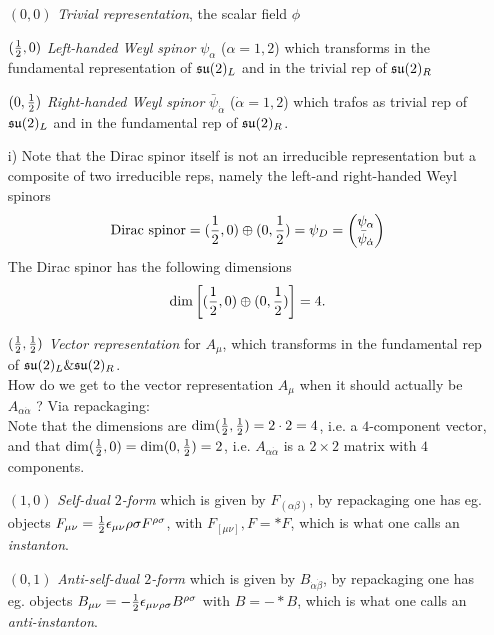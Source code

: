 \begin{enumerate}
\item[$(0,0)$] \emph{Trivial representation}, the scalar field $\phi$
\item[$(\frac{1}{2},0)$] \emph{Left-handed Weyl spinor} $\psi_\alpha$ ($\alpha=1,2$) which transforms in the fundamental representation of $\mathfrak{su}(2)_L$ and in the trivial rep of $\mathfrak{su}(2)_R$
\item[$(0,\frac{1}{2})$] \emph{Right-handed Weyl spinor} $\bar{ \psi}_{\dot{\alpha}}$ ($\dot{\alpha}=1,2$) which trafos as trivial rep of $\mathfrak{su}(2)_L$ and in the fundamental rep of $\mathfrak{su}(2)_R$.
\item[i)] Note that the Dirac spinor itself is not an irreducible representation but a composite of two irreducible reps, namely the left-and right-handed Weyl spinors
\begin{equation*}
	\text{Dirac spinor} = (\frac{1}{2},0) \oplus (0,\frac{1}{2}) = \psi_D = \begin{pmatrix}
		\psi_\alpha\\
		\bar{ \psi}_{\dot{\alpha}}\\
			\end{pmatrix}
\end{equation*}
The Dirac spinor has the following dimensions
\begin{equation*}
 \dim\left[(\frac{1}{2},0)\oplus (0,\frac{1}{2}) \right] = 4.
\end{equation*}

\item[$(\frac{1}{2},\frac{1}{2})$] \emph{Vector representation} for $A_\mu$, which transforms in the fundamental rep of $\mathfrak{su}(2)_L\&\mathfrak{su}(2)_R$.\\
How do we get to the vector representation $A_\mu$ when it should actually be $A_{\alpha \dot{\alpha}}$ ? Via repackaging:\\
Note that the dimensions are $\dim(\frac{1}{2},\frac{1}{2})=2\cdot 2=4$, i.e. a $4$-component vector, and that $\dim(\frac{1}{2},0)=\dim(0,\frac{1}{2})=2$, i.e. $A_{\alpha \dot{\alpha}}$ is a $2\times2$ matrix with $4$ components.
\item[$(1,0)$] \emph{Self-dual $2$-form} which is given by $F_{(\alpha \beta)}$, by repackaging one has eg. objects $F_{\mu \nu}= \frac{1}{2} \epsilon{_{\mu \nu}\rho \sigma} F^{\rho \sigma}$, with $F_[\mu \nu], F=*F$, which is what one calls an \emph{instanton}.
\item[$(0,1)$] \emph{Anti-self-dual $2$-form} which is given by $B_{\dot{\alpha}\dot{\beta}}$, by repackaging one has eg. objects $B_{\mu \nu}= - \frac{1}{2} \epsilon_{\mu \nu\rho \sigma} B^{\rho \sigma}$ with $B=-*B$, which is what one calls an \emph{anti-instanton}.
\end{enumerate}

